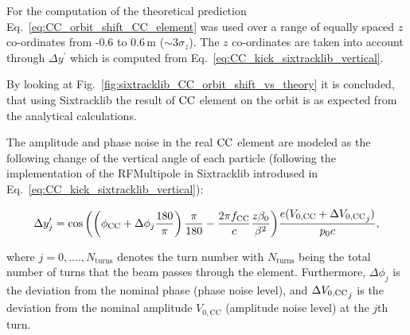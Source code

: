 For the computation of the theoretical prediction Eq.~\eqref{eq:CC_orbit_shift_CC_element} was used over a range of equally spaced $z$ co-ordinates from -0.6 to 0.6\,m ($\sim 3 \sigma_z$). The $z$ co-ordinates are taken into account through $\Delta y^\prime$ which is computed from Eq.~\eqref{eq:CC_kick_sixtracklib_vertical}.

By looking at Fig.~\ref{fig:sixtracklib_CC_orbit_shift_vs_theory} it is concluded, that using Sixtracklib the result of ${\mathrm{CC}}$ element on the orbit is as expected from the analytical calculations. %

The amplitude and phase noise in the real ${\mathrm{CC}}$ element are modeled as the following change of the vertical angle of each particle (following the implementation of the RFMultipole in Sixtracklib introdused in Eq.~\eqref{eq:CC_kick_sixtracklib_vertical}):



\begin{equation}\label{eq:CC_kick_sixtracklib_vertical_noise}
    \Delta y^\prime_{j} = \cos{\left ( \left (\phi_\mathrm{CC} + \Delta \phi_j \frac{180}{\pi} \right ) \frac{\pi}{180} - \frac{2\pi f_\mathrm{CC}}{c} \frac{z \beta_0}{\beta^2} \right )} \frac{ e( {V_\mathrm{0, CC}} + \Delta {V_\mathrm{0, CC}}_j)}{p_0 c},
\end{equation}

where $j={0, ...., N_\mathrm{turns}}$ denotes the turn number with $N_\mathrm{turns}$ being the total number of turns that the beam passes through the element. Furthermore, $\Delta \phi_j$ is the deviation from the nominal phase (phase noise level), and $\Delta {V_\mathrm{0, CC}}_j$ is the deviation from the nominal amplitude $V_\mathrm{0,CC}$ (amplitude noise level) at the $j$th turn. 

